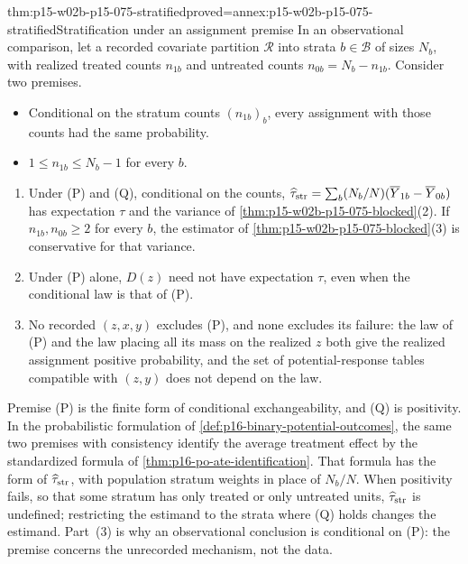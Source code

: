 \begin{hbtheorem}{thm:p15-w02b-p15-075-stratified}{proved=annex:p15-w02b-p15-075-stratified}{Stratification under an assignment premise}
In an observational comparison, let a recorded covariate partition
\(\mathcal R\) into strata \(b\in\mathcal B\) of sizes \(N_b\), with realized
treated counts \(n_{1b}\) and untreated counts \(n_{0b}=N_b-n_{1b}\).
Consider two premises.
\begin{itemize}
\item[(P)] Conditional on the stratum counts \((n_{1b})_b\), every assignment
with those counts had the same probability.
\item[(Q)] \(1\leq n_{1b}\leq N_b-1\) for every \(b\).
\end{itemize}
\begin{enumerate}
\item Under (P) and (Q), conditional on the counts,
\(\widehat\tau_{\rm str}=\sum_b(N_b/N)(\overline Y_{1b}-\overline Y_{0b})\)
has expectation \(\tau\) and the variance of
\cref{thm:p15-w02b-p15-075-blocked}(2). If \(n_{1b},n_{0b}\geq2\) for every
\(b\), the estimator of \cref{thm:p15-w02b-p15-075-blocked}(3) is
conservative for that variance.
\item Under (P) alone, \(D(z)\) need not have expectation \(\tau\), even when
the conditional law is that of (P).
\item No recorded \((z,x,y)\) excludes (P), and none excludes its failure: the
law of (P) and the law placing all its mass on the realized \(z\) both give
the realized assignment positive probability, and the set of potential-response
tables compatible with \((z,y)\) does not depend on the law.
\end{enumerate}
\end{hbtheorem}

Premise (P) is the finite form of conditional exchangeability, and (Q) is
positivity. In the probabilistic formulation of
\cref{def:p16-binary-potential-outcomes}, the same two premises with
consistency identify the average treatment effect by the standardized formula
of \cref{thm:p16-po-ate-identification}. That formula has the form of
\(\widehat\tau_{\rm str}\), with population stratum weights in place of
\(N_b/N\). When positivity fails, so that some stratum has only treated or only
untreated units, \(\widehat\tau_{\rm str}\) is undefined; restricting the
estimand to the strata where (Q) holds changes the estimand. Part~(3) is why
an observational conclusion is conditional on (P): the premise concerns the
unrecorded mechanism, not the data.

